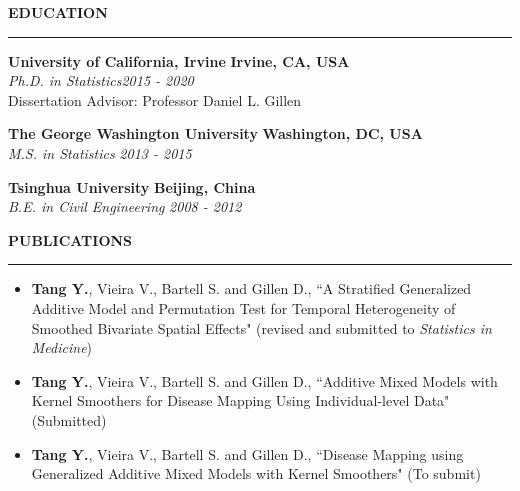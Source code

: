 %
\curriculumvitae
{
	\textbf{EDUCATION} \hrule
	{\bf University of California, Irvine} \hfill {\bf Irvine, CA, USA}\\
	{\em Ph.D. in Statistics}\hfill {\em 2015 - 2020} \\
	Dissertation Advisor: Professor Daniel L. Gillen
	
	{\bf The George Washington University} \hfill {\bf Washington, DC, USA} \\
	{\em M.S. in Statistics} \hfill {\em 2013 - 2015}
	
	{\bf Tsinghua University} \hfill {\bf Beijing, China} \\
	{\em B.E. in Civil Engineering} \hfill {\em 2008 - 2012}

	\vspace{12pt}
	\textbf{PUBLICATIONS}  \hrule
	\vspace{-0.15 in}
	\begin{itemize} \setlength{\itemsep}{2pt}  \setlength{\parskip}{0pt}
		\item {\textbf{Tang Y.}, Vieira V., Bartell S. and Gillen D., ``A Stratified Generalized Additive Model and Permutation Test for Temporal Heterogeneity of Smoothed Bivariate Spatial Effects"} (revised and submitted to \textit{Statistics in Medicine}) 
		\item \textbf{Tang Y.}, Vieira V., Bartell S. and Gillen D., ``Additive Mixed Models with Kernel Smoothers for Disease Mapping Using Individual-level Data" (Submitted)
		\item {\textbf{Tang Y.}, Vieira V., Bartell S. and Gillen D., ``Disease Mapping using Generalized Additive Mixed Models with Kernel Smoothers"} (To submit)
	\end{itemize}

}
